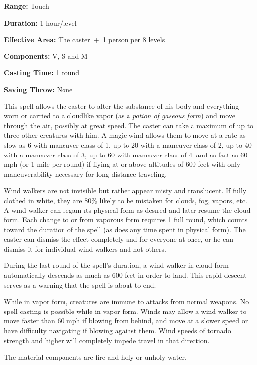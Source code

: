 \begin{multicols}{2}
\begin{minipage}{\columnwidth}
\noindent \textbf{Range:} Touch

\noindent \textbf{Duration:} 1 hour/level

\noindent \textbf{Effective Area:} The caster~+~1 person per 8 levels

\noindent \textbf{Components:} V, S and M

\noindent \textbf{Casting Time:} 1 round

\noindent \textbf{Saving Throw:} None

\end{minipage}

This spell allows the caster to alter the substance of his body and everything worn or carried to a cloudlike vapor (as a \textit{potion of gaseous form}) and move through the air, possibly at great speed.  The caster can take a maximum of up to three other creatures with him.  A magic wind allows them to move at a rate as slow as 6 with maneuver class of 1, up to 20 with a maneuver class of 2, up to 40 with a maneuver class of 3, up to 60 with maneuver class of 4, and as fast as 60 mph (or 1 mile per round) if flying at or above altitudes of 600 feet with only maneuverability necessary for long distance traveling.  

Wind walkers are not invisible but rather appear misty and translucent.  If fully clothed in white, they are 80\% likely to be mistaken for clouds, fog, vapors, etc.  A wind walker can regain its physical form as desired and later resume the cloud form.  Each change to or from vaporous form requires 1 full round, which counts toward the duration of the spell (as does any time spent in physical form).  The caster can dismiss the effect completely and for everyone at once, or he can dismiss it for individual wind walkers and not others. 

During the last round of the spell's duration, a wind walker in cloud form automatically descends as much as 600 feet in order to land.  This rapid descent serves as a warning that the spell is about to end.

While in vapor form, creatures are immune to attacks from normal weapons.  No spell casting is possible while in vapor form.  Winds may allow a wind walker to move faster than 60 mph if blowing from behind, and move at a slower speed or have difficulty navigating if blowing against them.  Wind speeds of tornado strength and higher will completely impede travel in that direction.

The material components are fire and holy or unholy water.


\end{multicols}
